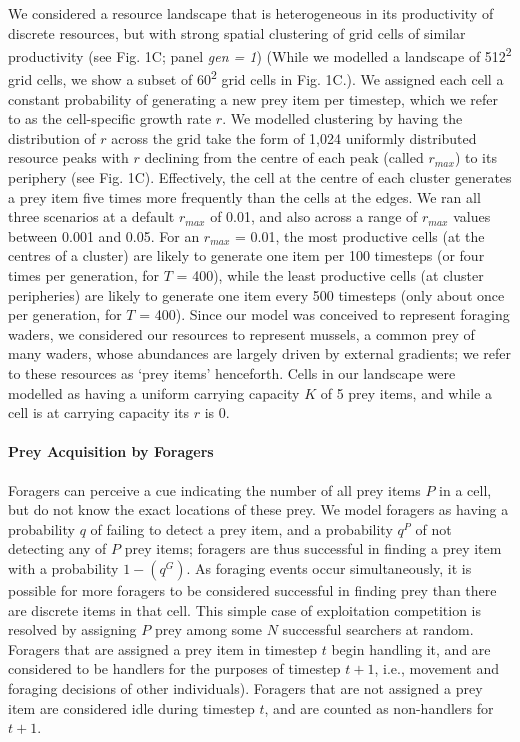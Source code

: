 \documentclass[11pt]{article}
\begin{document}
We considered a resource landscape that is heterogeneous in its productivity of discrete resources, but with strong spatial clustering of grid cells of similar productivity (see Fig. 1C; panel \textit{gen = 1}) (While we modelled a landscape of 512\textsuperscript{2} grid cells, we show a subset of 60\textsuperscript{2} grid cells in Fig. 1C.).
We assigned each cell a constant probability of generating a new prey item per timestep, which we refer to as the cell-specific growth rate $r$.
We modelled clustering by having the distribution of $r$ across the grid take the form of 1,024 uniformly distributed resource peaks with $r$ declining from the centre of each peak (called $r_{max}$) to its periphery (see Fig. 1C).
Effectively, the cell at the centre of each cluster generates a prey item five times more frequently than the cells at the edges.
We ran all three scenarios at a default $r_{max}$ of 0.01, and also across a range of $r_{max}$ values between 0.001 and 0.05.
For an $r_{max}$ = 0.01, the most productive cells (at the centres of a cluster) are likely to generate one item per 100 timesteps (or four times per generation, for $T$ = 400), while the least productive cells (at cluster peripheries) are likely to generate one item every 500 timesteps (only about once per generation, for $T$ = 400).
Since our model was conceived to represent foraging waders, we considered our resources to represent mussels, a common prey of many waders, whose abundances are largely driven by external gradients; we refer to these resources as `prey items' henceforth.
Cells in our landscape were modelled as having a uniform carrying capacity $K$ of 5 prey items, and while a cell is at carrying capacity its $r$ is 0.

\paragraph{Prey Acquisition by Foragers}

Foragers can perceive a cue indicating the number of all prey items $P$ in a cell, but do not know the exact locations of these prey.
We model foragers as having a probability $q$ of failing to detect a prey item, and a probability $q^P$ of not detecting any of $P$ prey items; foragers are thus successful in finding a prey item with a probability $1 - (q^G)$.
As foraging events occur simultaneously, it is possible for more foragers to be considered successful in finding prey than there are discrete items in that cell.
This simple case of exploitation competition is resolved by assigning $P$ prey among some $N$ successful searchers at random.
Foragers that are assigned a prey item in timestep $t$ begin handling it, and are considered to be handlers for the purposes of timestep $t+1$, i.e., movement and foraging decisions of other individuals).
Foragers that are not assigned a prey item are considered idle during timestep $t$, and are counted as non-handlers for $t+1$.
\end{document}
